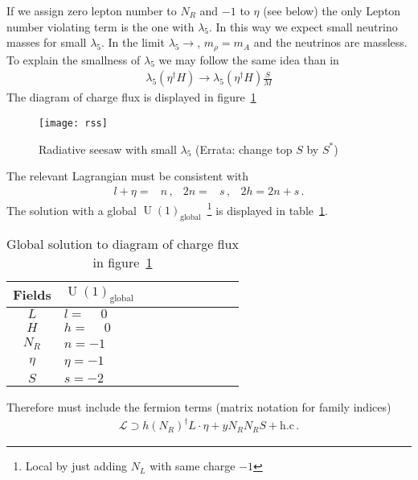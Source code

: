 If we assign zero lepton number to $N_R$ and $-1$ to $\eta$ (see below) the only Lepton number violating term is the one with $\lambda_5$. In this way we expect small neutrino masses for small $\lambda_5$. In the limit $\lambda_5\to $, $m_{\rho}=m_A$ and the neutrinos are massless.
To explain the smallness of $\lambda_5$ we may follow the same idea than in~\cite{Suematsu:2017kcu}
\begin{align}
  \lambda_5 \left( \eta^{\dagger}H \right) \to    \lambda_5 \left( \eta^{\dagger}H \right) \frac{S}{M}
\end{align}
The diagram of charge flux is displayed in figure~\ref{fig:rss}
\begin{figure}
  \centering
  \texttt{[image: rss]}
  \caption{Radiative seesaw with small $\lambda_5$ (Errata: change top $S$ by $S^{*}$)}
  \label{fig:rss}
\end{figure}

The relevant Lagrangian must be consistent with
\begin{align}
  l+\eta=&n\,,& 2n=&s\,, & 2h=2n+s\,.
\end{align}
The solution with a global $\operatorname{U}(1)_{\text{global}}$~\cite{Suematsu:2017kcu}\footnote{Local by just adding $N_L$ with same charge $-1$} is displayed in table~\ref{tab:suematsu}.

\begin{table}
  \centering
  \begin{tabular}{c|ll}
    Fields&$\operatorname{U}(1)_{\text{global}}$& $\phantom{\operatorname{U}(1)_X}$\\ \hline
    $L$   & $l=\phantom{-}0$&$\phantom{l=-1}$\\
    $H$   & $h=\phantom{-}0$&$\phantom{h=-1-l=0}$\\
    $N_R$ & $n=-1$          &$\phantom{n=-1/2}$\\
    $\eta$& $\eta=-1$       &$\phantom{-1/2-l=1/2}$ \\
    $S$   & $s=-2$         &$\phantom{s=-1}$ \\
  \end{tabular}
  \caption{Global solution to diagram of charge flux in figure~\ref{fig:rss}}
  \label{tab:suematsu}
\end{table}

Therefore must include the fermion terms (matrix notation for family indices)
\begin{align}
  \mathcal{L}\supset h \left( N_R \right)^{\dagger} L \cdot \eta + y N_R N_R S + \text{h.c}\,.
\end{align}

